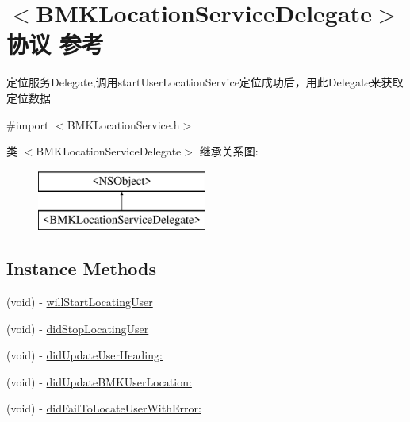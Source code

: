 \hypertarget{protocol_b_m_k_location_service_delegate-p}{\section{$<$B\+M\+K\+Location\+Service\+Delegate$>$协议 参考}
\label{protocol_b_m_k_location_service_delegate-p}
}


定位服务\+Delegate,调用start\+User\+Location\+Service定位成功后，用此\+Delegate来获取定位数据  




{\ttfamily \#import $<$B\+M\+K\+Location\+Service.\+h$>$}

类 $<$B\+M\+K\+Location\+Service\+Delegate$>$ 继承关系图\+:\begin{figure}[H]
\begin{center}
\leavevmode
\includegraphics[height=2.000000cm]{protocol_b_m_k_location_service_delegate-p}
\end{center}
\end{figure}
\subsection*{Instance Methods}
\begin{DoxyCompactItemize}
\item 
(void) -\/ \hyperlink{protocol_b_m_k_location_service_delegate-p_a787a16ba232723b8c9594b468ce6714c}{will\+Start\+Locating\+User}
\item 
(void) -\/ \hyperlink{protocol_b_m_k_location_service_delegate-p_a03d0086502462319e2a007b837dc7e26}{did\+Stop\+Locating\+User}
\item 
(void) -\/ \hyperlink{protocol_b_m_k_location_service_delegate-p_a93b210b6948016039b9286cdb350cf13}{did\+Update\+User\+Heading\+:}
\item 
(void) -\/ \hyperlink{protocol_b_m_k_location_service_delegate-p_a3e9ba0b7fca0295aa46a2ad5a179645d}{did\+Update\+B\+M\+K\+User\+Location\+:}
\item 
(void) -\/ \hyperlink{protocol_b_m_k_location_service_delegate-p_a8653218e26f920bf67513c2c4fffb5be}{did\+Fail\+To\+Locate\+User\+With\+Error\+:}
\end{DoxyCompactItemize}


